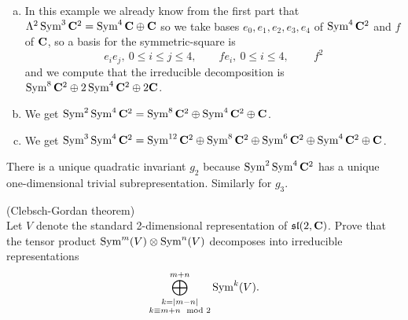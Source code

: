 \documentclass[12pt]{article}
\begin{document}
\begin{answer}
\begin{enumerate}[(a)]
\item In this example we already know from the first part that $\Lambda^2\operatorname{Sym}^3\mathbf{C}^2=\operatorname{Sym}^4\mathbf{C}\oplus\mathbf{C}$ so we take bases $e_0,e_1,e_2,e_3,e_4$ of $\operatorname{Sym}^4\mathbf{C}^2$ and $f$ of $\mathbf{C}$, so a basis for the symmetric-square is
\[e_ie_j,\ 0\leq i\leq j\leq 4,\qquad fe_i,\ 0\leq i\leq 4,\ \qquad f^2\]
and we compute that the irreducible decomposition is $\operatorname{Sym}^8\mathbf{C}^2\oplus 2\operatorname{Sym}^4\mathbf{C}^2\oplus2\mathbf{C}$.
\item We get $\operatorname{Sym}^2\operatorname{Sym}^4\mathbf{C}^2=\operatorname{Sym}^8\mathbf{C}^2\oplus\operatorname{Sym}^4\mathbf{C}^2\oplus\mathbf{C}$.
\item We get $\operatorname{Sym}^3\operatorname{Sym}^4\mathbf{C}^2=\operatorname{Sym}^{12}\mathbf{C}^2\oplus\operatorname{Sym}^8\mathbf{C}^2\oplus\operatorname{Sym}^6\mathbf{C}^2\oplus\operatorname{Sym}^4\mathbf{C}^2\oplus\mathbf{C}$.
\end{enumerate}
There is a unique quadratic invariant $g_2$ because $\operatorname{Sym}^2\operatorname{Sym}^4\mathbf{C}^2$ has a unique one-dimensional trivial subrepresentation. Similarly for $g_3$.
\end{answer}
\newpage

\bigskip

\begin{question}(Clebsch-Gordan theorem)\\
Let $V$ denote the standard 2-dimensional representation of $\mathfrak{sl}(2,\mathbf{C})$. Prove that the tensor product $\operatorname{Sym}^m(V)\otimes\operatorname{Sym}^n(V)$ decomposes into irreducible representations
\[\bigoplus_{\substack{k=|m-n|\\k\equiv m+n\mod 2}}^{m+n}\operatorname{Sym}^k(V).\]
\end{question}
\end{document}
